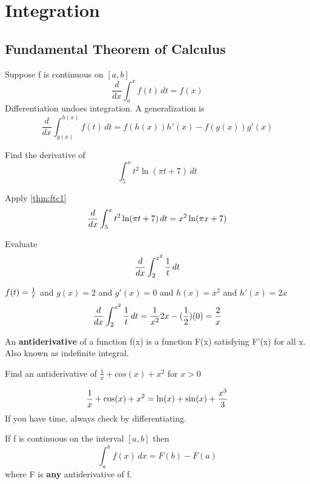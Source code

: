 \documentclass[english, 12pt]{article}
\begin{document}
\notesheader

\section{Integration}
\subsection{Fundamental Theorem of Calculus}
\begin{thrm}\label{thm:ftc1}
Suppose f is continuous on $[a,b]$
\[ \frac{d}{dx} \int_a^x f(t)\,dt = f(x)\]
Differentiation undoes integration. A generalization is 
\[ \frac{d}{dx} \int_{g(x)}^{h(x)} f(t)\,dt=f(h(x)) h'(x)-f(g(x))g'(x) \]
\end{thrm}
\begin{exmp}
Find the derivative of \[\int_5^x t^2 \ln(\pi t+7)\,dt \]
\begin{sol}
Apply \ref{thm:ftc1}
\[\frac{d}{dx} \int_5^x t^2 \ln(\pi t+7)\,dt = x^2 \ln (\pi x+7)\]
\end{sol}
\end{exmp}

\begin{exmp}
Evaluate \[\frac{d}{dx}\int_{2}^{x^2} \frac{1}{t} \,dt \]
\end{exmp}
\begin{sol}
$f(t)=\frac{1}{t} $ and $g(x)=2$ and $g'(x)=0$ and $h(x)=x^2$ and $h'(x)=2x$
\[ \frac{d}{dx} \int_{2}^{x^2}\frac 1 t \,dt = \frac{1}{x^2} 2x-(\frac{1}{2})(0) = \frac{2}{x}\]
\end{sol}

\begin{defn}\label{ader}
An {\bf antiderivative} of a function f(x) is a function F(x) satisfying F'(x) for all x. Also known as indefinite integral.
\end{defn}

\begin{exmp}
Find an antiderivative of $\frac 1 x + cos(x) + x^2$ for $x>0$
\end{exmp}
\begin{sol} \[\frac{1}{x} + \cos(x)+x^2=\ln(x) + \sin(x) + \frac{x^3}{3}\]
If you have time, always check by differentiating.
\end{sol}

\begin{thrm}\label{thm:ftc2}
If f is continuous on the interval $[a,b]$ then 
\[ \int_{a}^{b} f(x)\,dx = F(b) - F(a)\]
where F is {\bf any} antiderivative of f.
\end{thrm}
\end{document}

